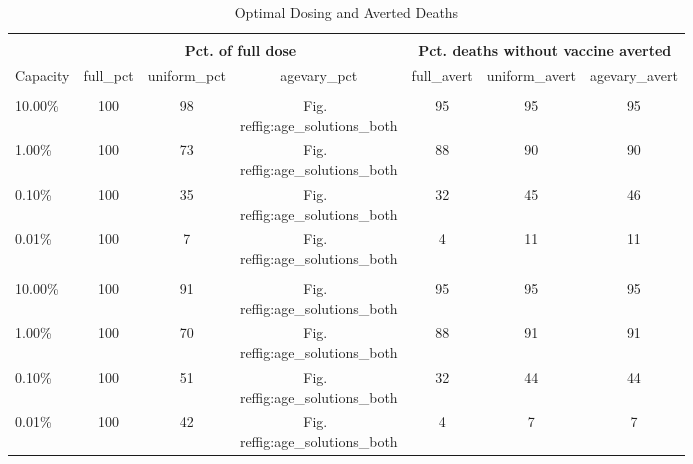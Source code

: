 \begin{table}[!h]
\centering
\caption{\label{tab:tab:results}Optimal Dosing and Averted Deaths}
\centering
\fontsize{9}{11}\selectfont
\begin{tabular}[t]{lcccccc}
\toprule
\multicolumn{1}{c}{ } & \multicolumn{3}{c}{ } & \multicolumn{3}{c}{ } \\

\multicolumn{1}{c}{\textbf{ }} & \multicolumn{3}{c}{\textbf{Pct. of full dose}} & \multicolumn{3}{c}{\textbf{Pct. deaths without vaccine averted}} \\
\cmidrule(l{3pt}r{3pt}){2-4} \cmidrule(l{3pt}r{3pt}){5-7}
Capacity & full_pct & uniform_pct & agevary_pct & full_avert & uniform_avert & agevary_avert\\
\midrule
\addlinespace[0.3em]
\multicolumn{7}{l}{\textbf{Concave Dose Response}}\\
10.00\% & 100 & 98 & \mc{1}{c}{Fig.~\\ref{fig:age_solutions_both}} & 95 & 95 & 95\\
1.00\% & 100 & 73 & \mc{1}{c}{Fig.~\\ref{fig:age_solutions_both}} & 88 & 90 & 90\\
0.10\% & 100 & 35 & \mc{1}{c}{Fig.~\\ref{fig:age_solutions_both}} & 32 & 45 & 46\\
0.01\% & 100 & 7 & \mc{1}{c}{Fig.~\\ref{fig:age_solutions_both}} & 4 & 11 & 11\\
\addlinespace[0.3em]
\multicolumn{7}{l}{\textbf{Sigmoid Dose Response}}\\
10.00\% & 100 & 91 & \mc{1}{c}{Fig.~\\ref{fig:age_solutions_both}} & 95 & 95 & 95\\
1.00\% & 100 & 70 & \mc{1}{c}{Fig.~\\ref{fig:age_solutions_both}} & 88 & 91 & 91\\
0.10\% & 100 & 51 & \mc{1}{c}{Fig.~\\ref{fig:age_solutions_both}} & 32 & 44 & 44\\
0.01\% & 100 & 42 & \mc{1}{c}{Fig.~\\ref{fig:age_solutions_both}} & 4 & 7 & 7\\
\bottomrule
\end{tabular}
\end{table}
